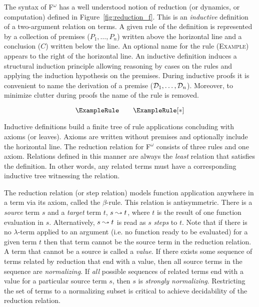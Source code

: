 

The syntax of F$^\omega$ has a well understood notion of reduction (or dynamics, or computation) defined in Figure~\ref{fig:reduction_f}.
This is an \textit{inductive} definition of a two-argument relation on terms.
A given rule of the definition is represented by a collection of premises ($P_1, \ldots, P_n$) written above the horizontal line and a conclusion ($C$) written below the line.
An optional name for the rule (\textsc{Example}) appears to the right of the horizontal line.
An inductive definition induces a structural induction principle allowing reasoning by cases on the rules and applying the induction hypothesis on the premises.
During inductive proofs it is convenient to name the derivation of a premise ($\mathcal{D}_{1}, \ldots, \mathcal{D}_{n}$).
Moreover, to minimize clutter during proofs the name of the rule is removed.

$$\ExampleRule \quad\quad \ExampleRule[*]$$

Inductive definitions build a finite tree of rule applications concluding with axioms (or leaves).
Axioms are written without premises and optionally include the horizontal line.
The reduction relation for F$^\omega$ consists of three rules and one axiom.
Relations defined in this manner are always the \textit{least} relation that satisfies the definition.
In other words, any related terms must have a corresponding inductive tree witnessing the relation.

The reduction relation (or step relation) models function application anywhere in a term via its axiom, called the $\beta$-rule.
This relation is antisymmetric.
There is a \textit{source} term $s$ and a \textit{target} term $t$, $s \leadsto t$, where $t$ is the result of one function evaluation in $s$.
Alternatively, $s \leadsto t$ is read as $s$ \textit{steps} to $t$.
Note that if there is no $\lambda$-term applied to an argument (i.e. no function ready to be evaluated) for a given term $t$ then that term cannot be the source term in the reduction relation.
A term that cannot be a source is called a \textit{value}.
If there exists some sequence of terms related by reduction that end with a value, then all source terms in the sequence are \textit{normalizing}.
If \textit{all} possible sequences of related terms end with a value for a particular source term $s$, then $s$ is \textit{strongly normalizing}.
Restricting the set of terms to a normalizing subset is critical to achieve decidability of the reduction relation.

